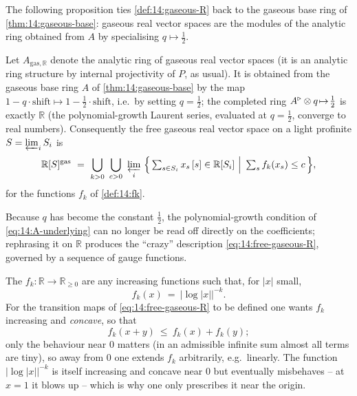 The following proposition ties \cref{def:14:gaseous-R} back to the gaseous base ring
of \cref{thm:14:gaseous-base}: gaseous real vector spaces are the modules of the
analytic ring obtained from $A$ by specialising $q\mapsto\tfrac12$.

\begin{proposition}
\label{prop:14:specialise}
Let $A_{\mathrm{gas},\mathbb{R}}$ denote the analytic ring of gaseous real vector
spaces (it is an analytic ring structure by internal projectivity of $P$, as
usual). It is obtained from the gaseous base ring $A$ of \cref{thm:14:gaseous-base}
by the map $1-q\cdot\mathrm{shift}\mapsto 1-\tfrac12\cdot\mathrm{shift}$, i.e.\ by
setting $q=\tfrac12$; the completed ring $A^{\triangleright}\otimes q\!\mapsto\!\tfrac12$ is
exactly $\mathbb{R}$ (the polynomial-growth Laurent series, evaluated at
$q=\tfrac12$, converge to real numbers). Consequently the free gaseous real vector
space on a light profinite $S=\varprojlim_i S_i$ is
\begin{equation}
\label{eq:14:free-gaseous-R}
\mathbb{R}[S]^{\mathrm{gas}}\ =\ \bigcup_{k>0}\ \bigcup_{c>0}\ \varprojlim_i\ \Bigl\{\,\textstyle\sum_{s\in S_i} x_s\,[s]\in\mathbb{R}[S_i]\ \Big|\ \sum_{s} f_k(x_s)\le c\,\Bigr\},
\end{equation}
for the functions $f_k$ of \cref{def:14:fk}.
\end{proposition}

Because $q$ has become the constant $\tfrac12$, the polynomial-growth condition of
\eqref{eq:14:A-underlying} can no longer be read off directly on the coefficients;
rephrasing it on $\mathbb{R}$ produces the ``crazy'' description
\eqref{eq:14:free-gaseous-R}, governed by a sequence of gauge functions.

\begin{definition}
\label{def:14:fk}
The $f_k\colon\mathbb{R}\to\mathbb{R}_{\ge0}$ are any increasing functions such that,
for $|x|$ small,
\begin{equation}
\label{eq:14:fk}
f_k(x)\ =\ \bigl|\log|x|\bigr|^{-k}.
\end{equation}
For the transition maps of \eqref{eq:14:free-gaseous-R} to be defined one wants
$f_k$ increasing and \emph{concave}, so that
\begin{equation*}
f_k(x+y)\ \le\ f_k(x)+f_k(y);
\end{equation*}
only the behaviour near $0$ matters (in an admissible infinite sum almost all terms
are tiny), so away from $0$ one extends $f_k$ arbitrarily, e.g.\ linearly. The
function $|\log|x||^{-k}$ is itself increasing and concave near $0$ but eventually
misbehaves -- at $x=1$ it blows up -- which is why one only prescribes it near the
origin.
\end{definition}

